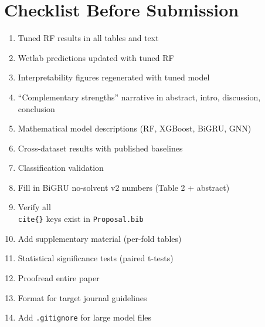 \documentclass[11pt,a4paper]{article}
\newcommand{\TODO}[1]{\textcolor{todo}{\textbf{TODO:} #1}}
\newcommand{\DONE}[1]{\textcolor{done}{\textbf{DONE:} #1}}
\begin{document}
\section{Checklist Before Submission}

\begin{enumerate}
    \item[\DONE{}] Tuned RF results in all tables and text
    \item[\DONE{}] Wetlab predictions updated with tuned RF
    \item[\DONE{}] Interpretability figures regenerated with tuned model
    \item[\DONE{}] ``Complementary strengths'' narrative in abstract, intro, discussion, conclusion
    \item[\DONE{}] Mathematical model descriptions (RF, XGBoost, BiGRU, GNN)
    \item[\DONE{}] Cross-dataset results with published baselines
    \item[\DONE{}] Classification validation
    \item[\DONE{}] Fill in BiGRU no-solvent v2 numbers (Table 2 + abstract)
    \item[\TODO{}] Verify all \texttt{\\cite\{\}} keys exist in \texttt{Proposal.bib}
    \item[\TODO{}] Add supplementary material (per-fold tables)
    \item[\TODO{}] Statistical significance tests (paired t-tests)
    \item[\TODO{}] Proofread entire paper
    \item[\TODO{}] Format for target journal guidelines
    \item[\TODO{}] Add \texttt{.gitignore} for large model files
\end{enumerate}
\end{document}
